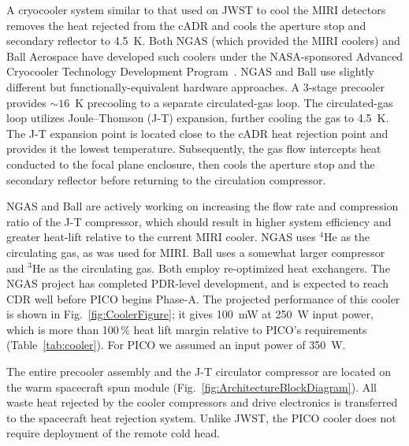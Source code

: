 A cryocooler system similar to that used on JWST to cool the MIRI detectors~\citep{Durand2008,Rabb2013} removes the heat rejected from the cADR and cools the aperture stop and secondary reflector to 4.5~K. Both NGAS (which provided the MIRI coolers) and Ball Aerospace have developed such coolers under the NASA-sponsored Advanced Cryocooler Technology Development Program~\citep{Glaister2006}. NGAS and Ball use slightly different but functionally-equivalent hardware approaches. A 3-stage precooler provides $\sim16$~K precooling to a separate circulated-gas loop.
The circulated-gas loop utilizes Joule--Thomson (J-T) expansion, further cooling the gas to 4.5~K.
The J-T expansion point is located close to the cADR heat rejection point and provides it the lowest temperature. Subsequently, the gas flow intercepts heat conducted to the focal plane enclosure, then cools the aperture stop and the secondary reflector before returning to the circulation compressor.  %

NGAS and Ball are actively working on increasing the flow rate and compression ratio of the J-T compressor,  which should result in higher system efficiency and greater heat-lift relative to the current MIRI cooler. 
NGAS uses $^4$He as the circulating gas, as was used for MIRI. Ball uses a somewhat larger compressor and $^3$He as the circulating gas. Both employ re-optimized heat exchangers. The NGAS project has completed PDR-level development, and is expected to reach CDR well before PICO begins Phase-A. The projected performance of this cooler is shown in Fig.~\ref{fig:CoolerFigure}; it gives 100~mW at 250~W input power, which is more than 100\,\% heat lift margin relative to PICO's requirements (Table~\ref{tab:cooler}). For PICO we assumed an input power of 350~W.

The entire precooler assembly and the J-T circulator compressor are located on the warm spacecraft spun module (Fig.~\ref{fig:ArchitectureBlockDiagram}).
All waste heat rejected by the cooler compressors and drive electronics is transferred to the spacecraft heat rejection system. Unlike JWST, the PICO cooler does not require deployment of the remote cold head.


